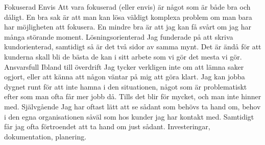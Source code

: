 \documentclass[]{cv-style}          %
\begin{document}
\begin{entrylist}
\entry
{\color{green} }
{Fokuserad}
{Envis}
{Att vara fokuserad (eller envis) är något som är både bra och dåligt. En bra 
sak är att man kan lösa väldigt komplexa problem om man bara har 
möjligheten att fokusera. En mindre bra är att jag kan få svårt om jag har
många störande moment.}
{\vspace{-0.8cm}}
\entry
{\color{green} }
{Lösningsorienterad}
{}
{Jag funderade på att skriva kundorienterad, samtidigt så är det två sidor
av samma mynt. Det är ändå för att kunderna skall bli de bästa de kan i sitt
arbete som vi gör det mesta vi gör.}
{\vspace{-0.4cm}}
\entry
{\color{green} }
{Ansvarsfull}
{Ibland till överdrift}
{Jag tycker verkligen inte om att lämna saker ogjort, eller att känna att någon
väntar på mig att göra klart. Jag kan jobba dygnet runt för att inte hamna i
den situationen, något som är problematiskt efter som man ofta får mer jobb då.
Tills det blir för mycket, och man inte hinner med.}
{\vspace{-0.4cm}}
\entry
{\color{green} }
{Självgående}
{}
{Jag har oftast lätt att se sådant som behövs ta hand om, behov i den
egna organisationen såväl som hos kunder jag har kontakt med. Samtidigt
får jag ofta förtroendet att ta hand om just sådant. Investeringar,
dokumentation, planering.}
{\vspace{-0.5cm}}
\end{entrylist}

%
%
\end{document}
